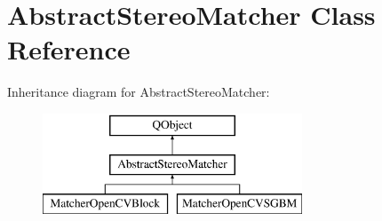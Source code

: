 \hypertarget{class_abstract_stereo_matcher}{}\section{Abstract\+Stereo\+Matcher Class Reference}
\label{class_abstract_stereo_matcher}
Inheritance diagram for Abstract\+Stereo\+Matcher\+:\begin{figure}[H]
\begin{center}
\leavevmode
\includegraphics[height=3.000000cm]{class_abstract_stereo_matcher}
\end{center}
\end{figure}
